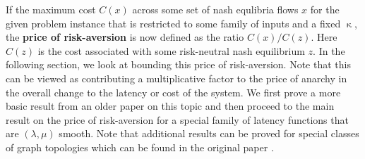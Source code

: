 If the maximum cost $C(x)$  across some set of nash equlibria flows $x$ for the given problem instance 
that is restricted to some family of inputs and a fixed $\upkappa$, the {\textbf{price of risk-aversion}} is now defined as the
ratio $C(x)/C(z)$. Here $C(z)$ is the cost associated with some risk-neutral nash equilibrium $z$. 
In the following section, we look at bounding this price of risk-aversion. Note that this can be viewed as contributing a 
multiplicative factor to the price of anarchy in the overall change to the latency or cost of the system. We first prove a 
more basic result from an older paper on this topic \cite{risk-averse-background} and then proceed to the main result on the price
of risk-aversion for 
a special family of latency functions that are $(\lambda, \mu)$ smooth. Note that additional results can be proved for special classes
of graph topologies which can be found in the original paper \cite{risk-averse}.




